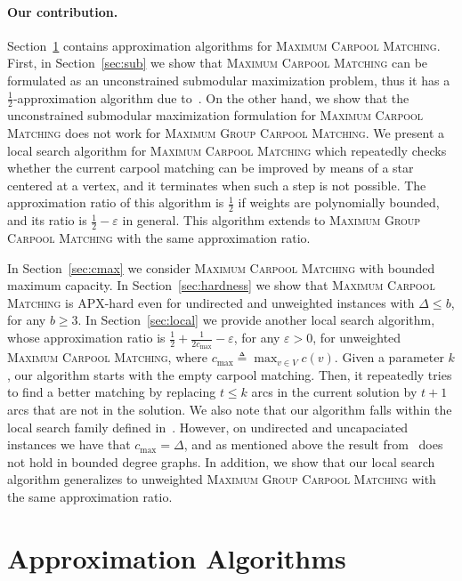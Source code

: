 \documentclass[11pt]{article}
\newcommand{\eqdf}{\triangleq}
\newcommand{\half}{\frac{1}{2}}
\newcommand{\inv}[1]{\frac{1}{#1}}
\newcommand{\carpool}{\textsc{Maximum Carpool Matching}\xspace}
\newcommand{\gcp}{\textsc{Maximum Group Carpool Matching}\xspace}
\newcommand{\cmax}{c_{\max}}
\newcommand{\eps}{\varepsilon}
\begin{document}
\paragraph*{Our contribution.}
%
Section~\ref{sec:approx} contains approximation algorithms for
\carpool.  First, in Section~\ref{sec:sub} we show that \carpool can
be formulated as an unconstrained submodular maximization problem,
thus it has a $\frac{1}{2}$-approximation algorithm due
to~\cite{BFNS15,buchbinder2016deterministic}.  On the other hand, we
show that the unconstrained submodular maximization formulation for
\carpool does not work for \gcp.
%
We present a local search algorithm for \carpool which repeatedly
checks whether the current carpool matching can be improved by means
of a star centered at a vertex, and it terminates when such a step is
not possible.
%
The approximation ratio of this algorithm is $\half$ if weights are
polynomially bounded, and its ratio is $\half-\eps$ in general.  This
algorithm extends to \gcp with the same approximation ratio.

In Section~\ref{sec:cmax} we consider \carpool with bounded maximum
capacity.   
%
In Section~\ref{sec:hardness} we show that \carpool is APX-hard even
for undirected and unweighted instances with $\Delta \leq b$, for any
$b \geq 3$.
%
In Section~\ref{sec:local} we provide another local search algorithm,
whose approximation ratio is $\half + \inv{2\cmax} - \eps$, for any
$\eps>0$, for unweighted \carpool, where $\cmax \eqdf \max_{v \in V}
c(v)$.  Given a parameter $k$, our algorithm starts with the empty
carpool matching.  Then, it repeatedly tries to find a better matching
by replacing $t \leq k$ arcs in the current solution by $t+1$ arcs
that are not in the solution.
%
%
We also note that our algorithm falls within the local search family
defined in~\cite{ACKK09}.  However, on undirected and uncapaciated
instances we have that $\cmax = \Delta$, and as mentioned above the
result from~\cite{ACKK09} does not hold in bounded degree graphs.
%
In addition, we show that our local search algorithm generalizes to
unweighted \gcp with the same approximation ratio.


\section{Approximation Algorithms}
\label{sec:approx}
\end{document}
